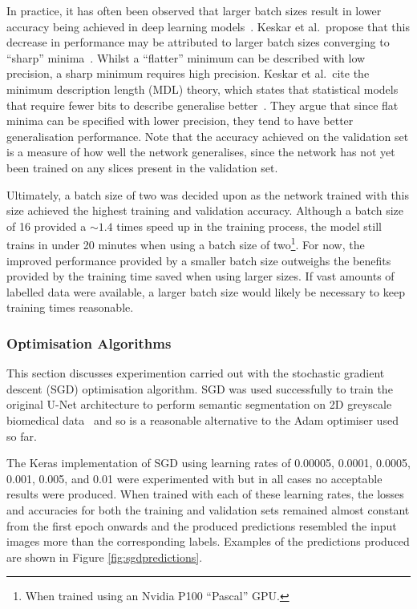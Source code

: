 In practice, it has often been observed that larger batch sizes result in lower accuracy being achieved in deep learning models~\cite{keskar2016large, smallbatch, largebatch}. Keskar et al.\ propose that this decrease in performance may be attributed to larger batch sizes converging to ``sharp'' minima~\cite{keskar2016large}. Whilst a ``flatter'' minimum can be described with low precision, a sharp minimum requires high precision. Keskar et al.\ cite the minimum description length (MDL) theory, which states that statistical models that require fewer bits to describe generalise better~\cite{rissanen}. They argue that since flat minima can be specified with lower precision, they tend to have better generalisation performance. Note that the accuracy achieved on the validation set is a measure of how well the network generalises, since the network has not yet been trained on any slices present in the validation set.

Ultimately, a batch size of two was decided upon as the network trained with this size achieved the highest training and validation accuracy. Although a batch size of 16 provided a ${\sim}1.4$ times speed up in the training process, the model still trains in under 20 minutes when using a batch size of two\footnote{When trained using an Nvidia P100 ``Pascal'' GPU.}. For now, the improved performance provided by a smaller batch size outweighs the benefits provided by the training time saved when using larger sizes. If vast amounts of labelled data were available, a larger batch size would likely be necessary to keep training times reasonable.

\subsubsection{Optimisation Algorithms}

This section discusses experimention carried out with the stochastic gradient descent (SGD) optimisation algorithm. SGD was used successfully to train the original U-Net architecture to perform semantic segmentation on 2D greyscale biomedical data~\cite{ronneberger2015u} and so is a reasonable alternative to the Adam optimiser used so far.

The Keras implementation of SGD using learning rates of 0.00005, 0.0001, 0.0005, 0.001, 0.005, and 0.01 were experimented with but in all cases no acceptable results were produced. When trained with each of these learning rates, the losses and accuracies for both the training and validation sets remained almost constant from the first epoch onwards and the produced predictions resembled the input images more than the corresponding labels. Examples of the predictions produced are shown in Figure \ref{fig:sgdpredictions}.

